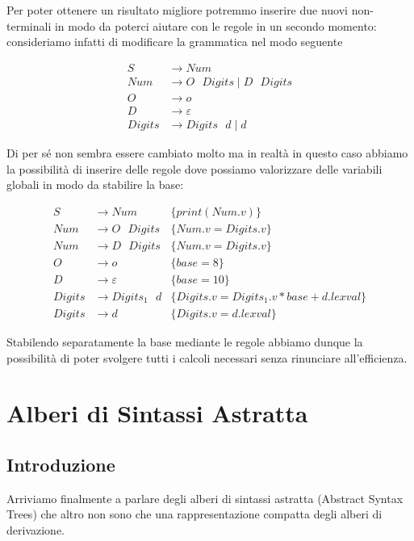 \documentclass[class=book, crop=false, oneside, 12pt]{standalone}
\begin{document}
Per poter ottenere un risultato migliore potremmo inserire due nuovi non-terminali in modo da poterci aiutare con le regole in un secondo momento: consideriamo infatti di modificare la grammatica nel modo seguente

\begin{align*}
    S &\to Num \\
    Num &\to O \textrm{ } Digits \mid D \textrm{ } Digits \\
    O &\to o \\ 
    D &\to \varepsilon \\
    Digits &\to Digits \textrm{ } d \mid d
\end{align*}

Di per sé non sembra essere cambiato molto ma in realtà in questo caso abbiamo la possibilità di inserire delle regole dove possiamo valorizzare delle variabili globali in modo da stabilire la base:

\begin{align*}
    S &\to Num &\{print(Num.v)\}\\
    Num &\to O \textrm{ } Digits &\{Num.v = Digits.v\}\\
    Num &\to D \textrm{ } Digits &\{Num.v = Digits.v\}\\
    O &\to o &\{base = 8\}\\ 
    D &\to \varepsilon &\{base = 10\}\\
    Digits &\to Digits_1 \textrm{ } d &\{Digits.v = Digits_1.v * base + d.lexval\}\\
    Digits &\to d &\{Digits.v = d.lexval\}
\end{align*}

Stabilendo separatamente la base mediante le regole abbiamo dunque la possibilità di poter svolgere tutti i calcoli necessari senza rinunciare all'efficienza. 

\section{Alberi di Sintassi Astratta}
\subsection{Introduzione}
Arriviamo finalmente a parlare degli alberi di sintassi astratta (Abstract Syntax Trees) che altro non sono che una rappresentazione compatta degli alberi di derivazione.
\end{document}
